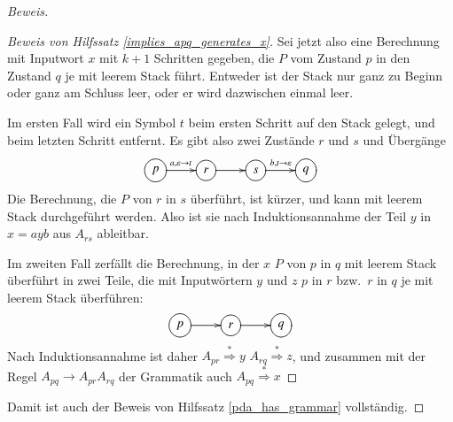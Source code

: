 \begin{proof}[Beweis]
\begin{proof}[Beweis von Hilfssatz \ref{implies_apq_generates_x}]
Sei jetzt also eine Berechnung mit Inputwort $x$
mit $k+1$ Schritten gegeben, die $P$ vom Zustand $p$ in den Zustand $q$ 
je mit leerem Stack führt.
Entweder ist der Stack nur ganz zu
Beginn oder ganz am Schluss leer, oder er wird dazwischen einmal
leer.

Im ersten Fall wird ein Symbol $t$ beim ersten Schritt auf den Stack
gelegt, und beim letzten Schritt entfernt.
Es gibt also zwei Zustände
$r$ und $s$ und Übergänge
\[
\entrymodifiers={++[o][F]}
\xymatrix{
p\ar[r]^{a,\varepsilon\to t}
	&r\ar[r]
		&s\ar[r]^{b,t\to\varepsilon}
			&q
}
\]
Die Berechnung, die $P$ von $r$ in $s$ überführt, ist kürzer, und kann
mit leerem Stack durchgeführt werden.
Also ist sie nach Induktionsannahme der Teil $y$ in $x=ayb$ aus
$A_{rs}$ ableitbar.

Im zweiten Fall zerfällt die Berechnung, in der $x$ $P$ von $p$ in
$q$  mit leerem Stack überführt in zwei Teile, die mit Inputwörtern
$y$ und $z$ $p$ in $r$ bzw.~$r$ in $q$ je mit leerem Stack überführen:
\[
\entrymodifiers={++[o][F]}
\xymatrix{
p\ar[r]
	&r\ar[r]
		&q
}
\]
Nach Induktionsannahme ist daher
$A_{pr}\overset{*}{\Rightarrow}y$
$A_{rq}\overset{*}{\Rightarrow}z$, und zusammen mit der Regel
$A_{pq}\to A_{pr}A_{rq}$ der Grammatik auch
$A_{pq}\overset{*}{\Rightarrow} x$
\end{proof}

Damit ist auch der Beweis von Hilfssatz \ref{pda_has_grammar} vollständig.
\end{proof}

